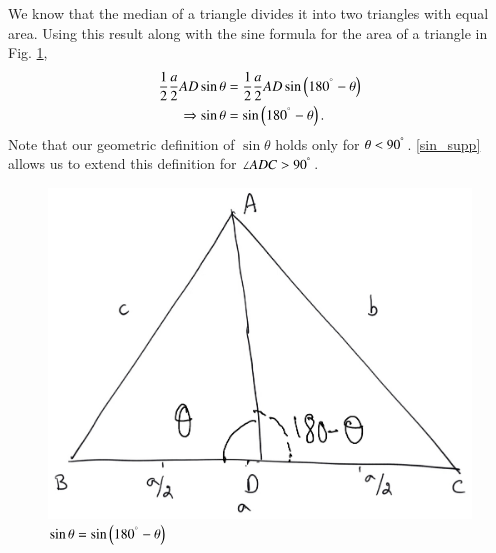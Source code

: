 \begin{definition}
	We know that the median of a triangle  divides it into two triangles with equal area. Using this result along with the sine formula for the area of a triangle in Fig. \ref{ch2_supp_sin},
\begin{align}
\frac{1}{2}\frac{a}{2}AD \sin \theta &= \frac{1}{2}\frac{a}{2}AD \sin \left(180^{\degree}-\theta\right) \\
\Rightarrow \sin \theta &= \sin \left(180^{\degree} - \theta\right).
\label{sin_supp}
\end{align}
Note that our geometric definition of $\sin \theta$ holds only for $\theta < 90^{\degree}$.  \eqref{sin_supp} allows us to extend this definition for $\angle ADC > 90^{\degree}$.
\end{definition}


\begin{figure}[!h]
	\begin{center}
		
		\includegraphics[width=\columnwidth]{./figs/ch2_supp_sin}
		\vspace*{-10cm}
	\end{center}
	\caption{$\sin \theta = \sin \left(180^{\degree}-\theta\right)$}
	\label{ch2_supp_sin}	
\end{figure}
%
